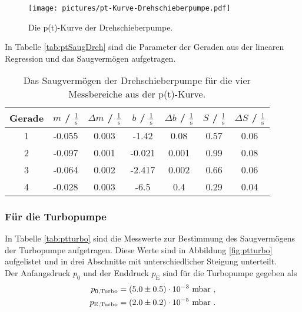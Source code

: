 \begin{figure} %
  \centering
  \texttt{[image: pictures/pt-Kurve-Drehschieberpumpe.pdf]}
  \caption{Die p(t)-Kurve der Drehschieberpumpe.}
  \label{fig:ptdreh}
\end{figure}

In Tabelle \eqref{tab:ptSaugDreh} sind die Parameter der Geraden aus der linearen Regression und das Saugvermögen aufgetragen.

\begin{table}
  \centering
  \caption{Das Saugvermögen der Drehschieberpumpe für die vier Messbereiche aus der p(t)-Kurve.}
  \label{tab:ptSaugDreh}
    \begin{tabular}{c|c|c|c|c|c|c}
      Gerade & $m$ / $\frac{1}{\text{s}}$ & $\Delta m$ / $\frac{1}{\text{s}}$ & $b$ / $\frac{1}{\text{s}}$ & $\Delta b$ / $\frac{1}{\text{s}}$ & $S$ / $\frac{\text{l}}{\text{s}}$ & $\Delta S$ / $\frac{\text{l}}{\text{s}}$ \\
      \midrule
      1 & -0.055 & 0.003 & -1.42  & 0.08  & 0.57 & 0.06 \\
      2 & -0.097 & 0.001 & -0.021 & 0.001 & 0.99 & 0.08 \\
      3 & -0.064 & 0.002 & -2.417 & 0.002 & 0.66 & 0.06 \\
      4 & -0.028 & 0.003 & -6.5   & 0.4   & 0.29 & 0.04 \\
    \end{tabular}
\end{table}



\subsubsection{Für die Turbopumpe}
In Tabelle \eqref{tab:ptturbo} sind die Messwerte zur Bestimmung des Saugvermögens der Turbopumpe aufgetragen. Diese Werte sind in Abbildung \eqref{fig:ptturbo} aufgelistet und in drei Abschnitte mit unterschiedlicher Steigung unterteilt. \\
Der Anfangsdruck $p_0$ und der Enddruck $p_\text{E}$ sind für die Turbopumpe gegeben als
\begin{align*}
  p_{0,\text{Turbo}} = (\num{5 +- 0.5})\cdot 10^{-3}\ \text{mbar} \ , \\
  p_{\text{E},\text{Turbo}} = (\num{2 +- 0.2})\cdot 10^{-5}\ \text{mbar} \ .
\end{align*}

